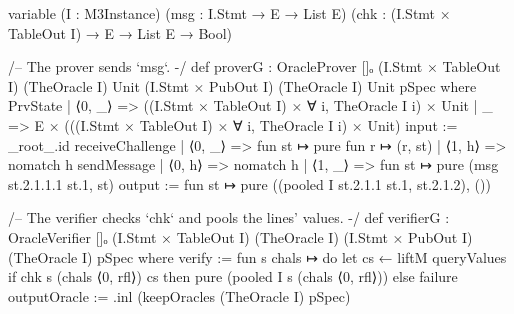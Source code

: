 \begin{leancode}
variable (I : M3Instance)
  (msg : I.Stmt → E → List E)
  (chk : (I.Stmt × TableOut I) → E → List E → Bool)

/-- The prover sends `msg`. -/
def proverG : OracleProver []ₒ (I.Stmt × TableOut I) (TheOracle I) Unit
    (I.Stmt × PubOut I) (TheOracle I) Unit pSpec where
  PrvState
    | ⟨0, _⟩ => ((I.Stmt × TableOut I) × ∀ i, TheOracle I i) × Unit
    | _ => E × (((I.Stmt × TableOut I) × ∀ i, TheOracle I i) × Unit)
  input := _root_.id
  receiveChallenge
    | ⟨0, _⟩ => fun st ↦ pure fun r ↦ (r, st)
    | ⟨1, h⟩ => nomatch h
  sendMessage
    | ⟨0, h⟩ => nomatch h
    | ⟨1, _⟩ => fun st ↦ pure (msg st.2.1.1.1 st.1, st)
  output := fun st ↦ pure ((pooled I st.2.1.1 st.1, st.2.1.2), ())

/-- The verifier checks `chk` and pools the lines' values. -/
def verifierG : OracleVerifier []ₒ (I.Stmt × TableOut I) (TheOracle I)
    (I.Stmt × PubOut I) (TheOracle I) pSpec where
  verify := fun s chals ↦ do
    let cs ← liftM queryValues
    if chk s (chals ⟨0, rfl⟩) cs then pure (pooled I s (chals ⟨0, rfl⟩)) else failure
  outputOracle := .inl (keepOracles (TheOracle I) pSpec)
\end{leancode}

